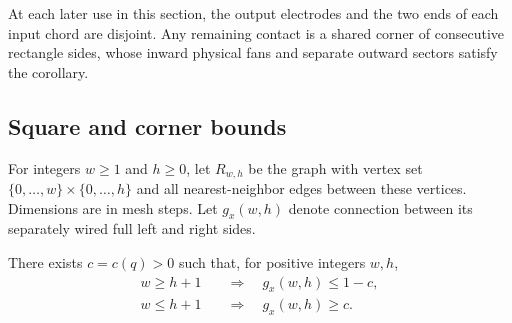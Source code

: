 At each later use in this section, the output electrodes and the two
ends of each input chord are disjoint. Any remaining contact is a
shared corner of consecutive rectangle sides, whose inward physical
fans and separate outward sectors satisfy the corollary.

\subsection{Square and corner bounds}

For integers $w\ge1$ and $h\ge0$, let $R_{w,h}$ be the graph with vertex set
$\{0,\ldots,w\}\times\{0,\ldots,h\}$ and all nearest-neighbor edges
between these vertices.  Dimensions are in mesh steps.  Let $g_x(w,h)$
denote connection between its separately wired full left and right sides.

\begin{lemma}
\label{rect:square}
There exists $c=c(q)>0$ such that, for positive integers $w,h$,
\begin{align}
 w\ge h+1&\quad\Longrightarrow\quad g_x(w,h)\le1-c,
 \label{rect:hard-square}\\
 w\le h+1&\quad\Longrightarrow\quad g_x(w,h)\ge c.
 \label{rect:easy-square}
\end{align}
\end{lemma}

